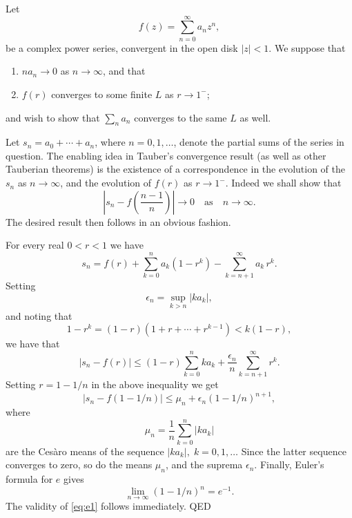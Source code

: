 \documentclass[12pt]{article}
\newcommand{\lp}{\left(}
\newcommand{\rp}{\right)}
\begin{document}
Let
$$f(z) = \sum_{n=0}^\infty a_n z^n,$$
be a complex power series, convergent in the open disk $\vert
z\vert<1$.  We suppose that
\begin{enumerate}
\item $n a_n\rightarrow 0$ as
$n\rightarrow\infty$, and that
\item  $f(r)$ converges to some finite  $L$ as
$r\rightarrow 1^-$;
\end{enumerate}
and wish to show that
$\sum_n a_n$ converges to the same $L$ as well.

Let $s_n=a_0+\cdots+a_n$, where $n=0,1,\ldots$, denote the partial
sums of the series in question.  The enabling idea in Tauber's
convergence result (as well as other Tauberian theorems) is the
existence of a correspondence in the evolution of the $s_n$ as
$n\rightarrow\infty$, and the evolution of $f(r)$ as $r\rightarrow
1^-$.  Indeed we shall show that
\begin{equation}
  \label{eq:e1}
  \left\vert s_n - f\lp \frac{n-1}{n} \rp\right\vert \rightarrow 0 \quad\text{as}\quad
  n\rightarrow \infty.  
\end{equation}
The desired result then follows in an obvious fashion.

For every real $0<r<1$ we have
$$s_n = f(r) + \sum_{k=0}^n a_k (1-r^k) - \sum_{k=n+1}^\infty a_k\, r^k.$$
Setting
$$\epsilon_n = \sup_{k>n}  \vert k a_k \vert,$$
and noting that
$$ 1-r^k = (1-r)(1+r+\cdots+r^{k-1}) < k(1-r),$$
we have that
$$
\vert s_n - f(r) \vert \leq (1-r)\sum_{k=0}^n ka_k +
\frac{\epsilon_n}{n}
\sum_{k=n+1}^\infty r^k.$$
Setting $r=1-1/n$ in the above inequality we get
$$
\vert s_n - f(1-1/n) \vert \leq \mu_n + \epsilon_n (1-1/n)^{n+1},$$
where
$$\mu_n = \frac{1}{n}\sum_{k=0}^n \vert k a_k \vert$$
are the Ces\`aro
means of the sequence $\vert k a_k\vert,\; k=0,1,\ldots$ 
Since the
latter sequence converges to zero, so do the means $\mu_n$, and the
suprema $\epsilon_n$.  Finally,
Euler's formula for $e$ gives
$$\lim_{n\rightarrow\infty}(1-1/n)^n = e^{-1}.$$
The validity of \eqref{eq:e1} follows immediately. QED

\end{document}

